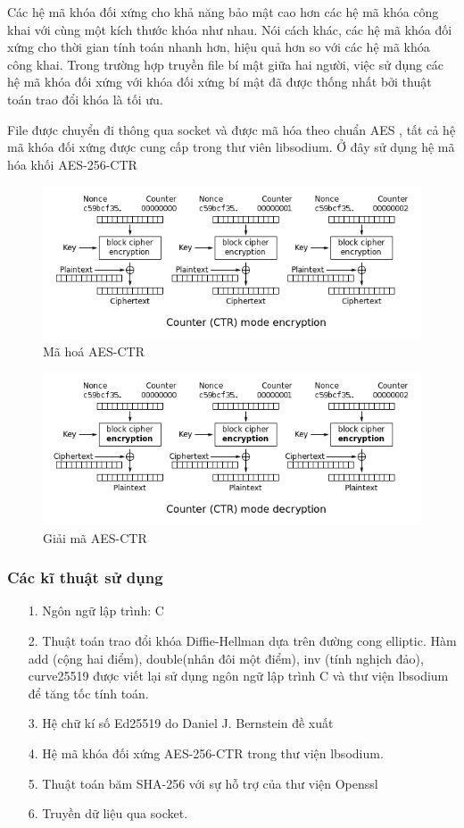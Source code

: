\documentclass[a4paper,12pt]{report}
\begin{document}
Các hệ mã khóa đối xứng cho khả năng bảo mật cao hơn các hệ mã khóa công khai với cùng một kích thước khóa như nhau. Nói cách khác, các hệ mã khóa đối xứng cho thời gian tính toán nhanh hơn, hiệu quả hơn so với các hệ mã khóa công khai. Trong trường hợp truyền file bí mật giữa hai người, việc sử dụng các hệ mã khóa đối xứng với khóa đối xứng bí mật đã được thống nhất bởi thuật toán trao đổi khóa là tối ưu.

File được chuyển đi thông qua socket và được mã hóa theo chuẩn AES , tất cả hệ mã khóa đối xứng được cung cấp trong thư viên libsodium. Ở đây sử dụng hệ mã hóa khối AES-256-CTR
\begin{center}
\begin{figure}[H]
\includegraphics[width=0.9\linewidth]{../ctr-en.png}
\caption{Mã hoá AES-CTR}
\end{figure}
\end{center}
\begin{center}
\begin{figure}[H]
\includegraphics[width=0.9\linewidth]{../ctr-de.png}
\caption{Giải mã AES-CTR}
\end{figure}
\end{center}
\subsubsection*{Các kĩ thuật sử dụng}
\begin{itemize}
\item[1. ] Ngôn ngữ lập trình: C
\item[2. ] Thuật toán trao đổi khóa Diffie-Hellman dựa trên đường cong elliptic. Hàm add (cộng hai điểm), double(nhân đôi một điểm), inv (tính nghịch đảo), curve25519 được viết lại sử
dụng ngôn ngữ lập trình C và thư viện lbsodium để tăng tốc tính toán.
\item[3. ] Hệ chữ kí số Ed25519 do Daniel J. Bernstein đề xuất
\item[4. ] Hệ mã khóa đối xứng AES-256-CTR trong thư viện lbsodium.
\item[5. ] Thuật toán băm SHA-256 với sự hỗ trợ của thư viện Openssl
\item[6. ] Truyền dữ liệu qua socket.
\end{itemize}
\end{document}
